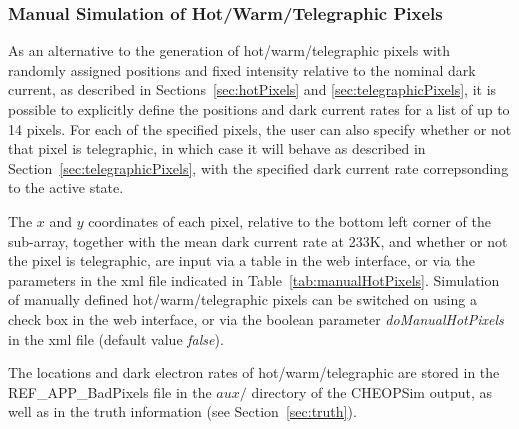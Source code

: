 \documentclass[11pt]{article}      %
\def\HCode#1{}
\def\htmlanchor#1{\HCode{<a id="#1"></a>}}
\begin{document}
\htmlanchor{manualHotPixels}
\subsubsection{Manual Simulation of Hot/Warm/Telegraphic Pixels}
\label{sec:manualHotPixels}

As an alternative to the generation of hot/warm/telegraphic pixels with randomly assigned positions and fixed intensity relative to the nominal dark current, as described in Sections~\ref{sec:hotPixels} and \ref{sec:telegraphicPixels}, it is possible to explicitly define the positions and dark current rates for a list of up to 14 pixels. For each of the specified pixels, the user can also specify whether or not that pixel is telegraphic, in which case it will behave as described in Section~\ref{sec:telegraphicPixels}, with the specified dark current rate correpsonding to the active state.

The $x$ and $y$ coordinates of each pixel, relative to the bottom left corner of the sub-array, together with the mean dark current rate at 233K, and whether or not the pixel is telegraphic, are input via a table in the web interface, or via the parameters in the xml file indicated in Table~\ref{tab:manualHotPixels}. Simulation of manually defined hot/warm/telegraphic pixels can be switched on using a check box in the web interface, or via the boolean parameter {\it doManualHotPixels} in the xml file (default value {\it false}).

The locations and dark electron rates of hot/warm/telegraphic are stored in the REF\_APP\_BadPixels file in the $aux/$ directory of the CHEOPSim output, as well as in the truth information (see Section~\ref{sec:truth}).
\end{document}
